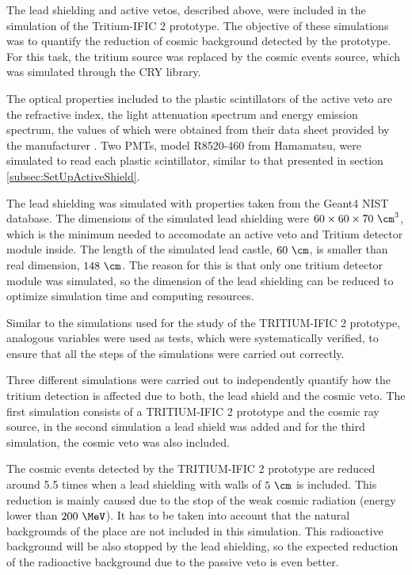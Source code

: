 The lead shielding and active vetos, described above, were included in the simulation of the Tritium-IFIC 2 prototype. The objective of these simulations was to quantify the reduction of cosmic background detected by the prototype. For this task, the tritium source was replaced by the cosmic events source, which was simulated through the CRY library.


The optical properties included to the plastic scintillators of the active veto are the refractive index, the light attenuation spectrum and energy emission spectrum, the values of which were obtained from their data sheet provided by the manufacturer \cite{ScintillatorVeto}. Two PMTs, model R8520-460 from Hamamatsu, were simulated to read each plastic scintillator, similar to that presented in section \ref{subsec:SetUpActiveShield}.

The lead shielding was simulated with properties taken from the Geant4 NIST database. The dimensions of the simulated lead shielding were $60 \times 60 \times 70~\cm^3$, which is the minimum needed to accomodate an active veto and Tritium detector module inside. The length of the simulated lead castle, $60~\cm$, is smaller than real dimension, $148~\cm$. The reason for this is that only one tritium detector module was simulated, so the dimension of the lead shielding can be reduced to optimize simulation time and computing resources.

Similar to the simulations used for the study of the TRITIUM-IFIC 2 prototype, analogous variables were used as tests, which were systematically verified, to ensure that all the steps of the simulations were carried out correctly.

Three different simulations were carried out to independently quantify how the tritium detection is affected due to both, the lead shield and the cosmic veto. The first simulation consists of a TRITIUM-IFIC 2 prototype and the cosmic ray source, in the second simulation a lead shield was added and for the third simulation, the cosmic veto was also included.

The cosmic events detected by the TRITIUM-IFIC 2 prototype are reduced around 5.5 times when a lead shielding with walls of $5~\cm$ is included. This reduction is mainly caused due to the stop of the weak cosmic radiation (energy lower than $200~\MeV$). It has to be taken into account that the natural backgrounds of the place are not included in this simulation. This radioactive background will be also stopped by the lead shielding, so the expected reduction of the radioactive background due to the passive veto is even better.

